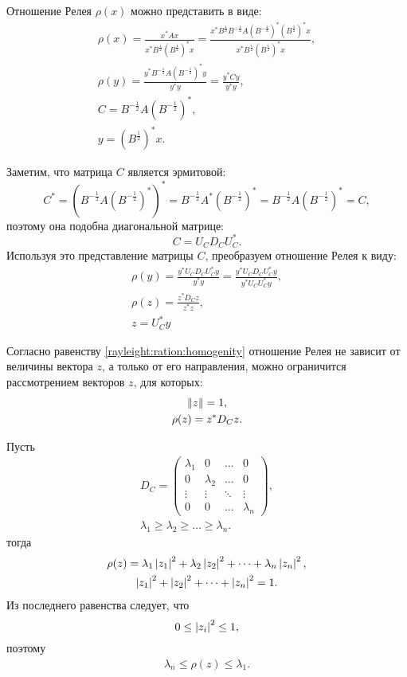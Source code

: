 Отношение Релея $\rho(x)$ можно представить в виде:
\begin{gather*}
    \rho(x)
    = \frac{x^* A x}{x^* B^\frac{1}{2} ( B^\frac{1}{2} )^* x}
    = \frac{x^* B^\frac{1}{2} B^{-\frac{1}{2}} A ( B^{-\frac{1}{2}} )^* ( B^\frac{1}{2} )^* x}{x^* B^\frac{1}{2} ( B^\frac{1}{2} )^* x} , \\
    \rho(y)
    = \frac{y^* B^{-\frac{1}{2}} A ( B^{-\frac{1}{2}} )^* y}{y^* y}
    = \frac{y^* C y}{y^* y}, \\
    C = B^{-\frac{1}{2}} A ( B^{-\frac{1}{2}} )^*, \\
    y = ( B^\frac{1}{2} )^* x .
\end{gather*}

Заметим, что матрица $C$ является эрмитовой:
\[
    C^*
    = ( B^{-\frac{1}{2}} A ( B^{-\frac{1}{2}} )^* )^*
    = B^{-\frac{1}{2}} A^* ( B^{-\frac{1}{2}} )^*
    = B^{-\frac{1}{2}} A ( B^{-\frac{1}{2}} )^*
    = C,
\]
поэтому она подобна диагональной матрице:
\[
    C = U_C D_C U_C^* .
\]
Используя это представление матрицы $C$, преобразуем отношение Релея к виду:
\begin{gather*}
    \rho(y)
    = \frac{y^* U_C D_C U_C^* y}{y^* y}
    = \frac{y^* U_C D_C U_C^* y}{y^* U_C U_C^* y} , \\
    \rho(z)
    = \frac{z^* D_C z}{z^* z} , \\
    z = U_C^* y
\end{gather*}

Согласно равенству \eqref{rayleight:ration:homogenity} отношение Релея не зависит от величины вектора $z$, а только от его направления, можно ограничится рассмотрением векторов $z$,
для которых:
\begin{gather*}
    \left \| z \right \| = 1 , \\
    \rho(z) = z^* D_C z .
\end{gather*}

Пусть
\begin{gather*}
    D_C
    = \begin{pmatrix}
          \lambda_1 & 0         & \dots  & 0         \\
          0         & \lambda_2 & \dots  & 0         \\
          \vdots    & \vdots    & \ddots & \vdots    \\
          0         & 0         & \dots  & \lambda_n
    \end{pmatrix} , \\
    \lambda_1 \ge \lambda_2 \ge \dots \ge \lambda_n.
\end{gather*}
тогда
\begin{gather*}
    \rho(z)
    = \lambda_1 \left | z_1 \right |^2 + \lambda_2 \left | z_2 \right |^2 + \dots + \lambda_n \left | z_n \right |^2, \\
    \left | z_1 \right |^2 + \left | z_2 \right |^2 + \dots + \left | z_n \right |^2 = 1.
\end{gather*}
Из последнего равенства следует, что
\[
    0 \le \left | z_i \right |^2 \le 1 ,
\]
поэтому
\begin{gather*}
    \lambda_n \le \rho(z) \le \lambda_1 .
\end{gather*}

